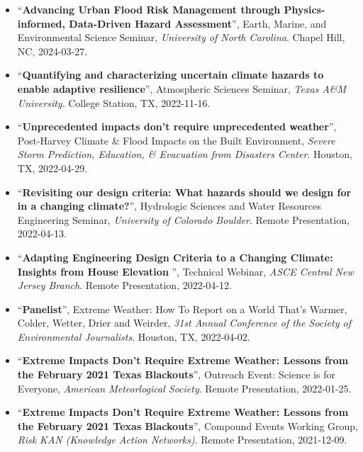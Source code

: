 \documentclass[10pt,oneside]{article}
\begin{document}
\begin{itemize}[label={}]

  \item \enquote{\textbf{Advancing Urban Flood Risk Management through Physics-informed, Data-Driven Hazard Assessment}}, Earth, Marine, and Environmental Science Seminar,  \textit{University of North Carolina}. Chapel Hill, NC, 2024-03-27.

  \item \enquote{\textbf{Quantifying and characterizing uncertain climate hazards to enable adaptive resilience}}, Atmospheric Sciences Seminar,  \textit{Texas A\&M University}. College Station, TX, 2022-11-16.

  \item \enquote{\textbf{Unprecedented impacts don't require unprecedented weather}}, Post-Harvey Climate \& Flood Impacts on the Built Environment,  \textit{Severe Storm Prediction, Education, \& Evacuation from Disasters Center}. Houston, TX, 2022-04-29.

  \item \enquote{\textbf{Revisiting our design criteria: What hazards should we design for in a changing climate?}}, Hydrologic Sciences and Water Resources Engineering Seminar,  \textit{University of Colorado Boulder}. Remote Presentation, 2022-04-13.

  \item \enquote{\textbf{Adapting Engineering Design Criteria to a Changing Climate: Insights from House Elevation }}, Technical Webinar,  \textit{ASCE Central New Jersey Branch}. Remote Presentation, 2022-04-12.

  \item \enquote{\textbf{Panelist}}, Extreme Weather: How To Report on a World That's Warmer, Colder, Wetter, Drier and Weirder,  \textit{31st Annual Conference of the Society of Environmental Journalists}. Houston, TX, 2022-04-02.

  \item \enquote{\textbf{Extreme Impacts Don't Require Extreme Weather: Lessons from the February 2021 Texas Blackouts}}, Outreach Event: Science is for Everyone,  \textit{American Meteorlogical Society}. Remote Presentation, 2022-01-25.

  \item \enquote{\textbf{Extreme Impacts Don't Require Extreme Weather: Lessons from the February 2021 Texas Blackouts}}, Compound Events Working Group,  \textit{Risk KAN (Knowledge Action Networks)}. Remote Presentation, 2021-12-09.


\end{itemize}
\end{document}
